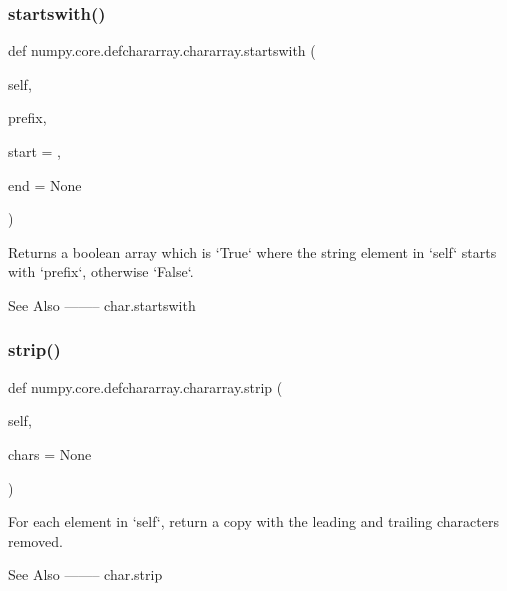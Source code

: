 \subsubsection{\texorpdfstring{startswith()}{startswith()}}
{\footnotesize\ttfamily def numpy.\+core.\+defchararray.\+chararray.\+startswith (\begin{DoxyParamCaption}\item[{}]{self,  }\item[{}]{prefix,  }\item[{}]{start = {},  }\item[{}]{end = {\ttfamily None} }\end{DoxyParamCaption})}

\begin{DoxyVerb}Returns a boolean array which is `True` where the string element
in `self` starts with `prefix`, otherwise `False`.

See Also
--------
char.startswith\end{DoxyVerb}
 \mbox{\label{classnumpy_1_1core_1_1defchararray_1_1chararray_a0db4bbb6ee6dbd1c014ce20cfab49a22}} 
\subsubsection{\texorpdfstring{strip()}{strip()}}
{\footnotesize\ttfamily def numpy.\+core.\+defchararray.\+chararray.\+strip (\begin{DoxyParamCaption}\item[{}]{self,  }\item[{}]{chars = {\ttfamily None} }\end{DoxyParamCaption})}

\begin{DoxyVerb}For each element in `self`, return a copy with the leading and
trailing characters removed.

See Also
--------
char.strip\end{DoxyVerb}
 \mbox{\label{classnumpy_1_1core_1_1defchararray_1_1chararray_ab3986a58cdd38215c6b0a3b2d75c73e1}} 
